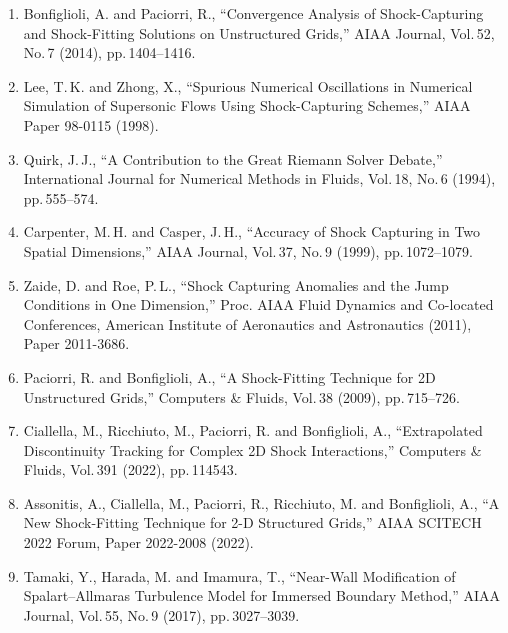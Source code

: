 \documentclass[a4j]{jarticle}
\begin{document}
\begin{enumerate}
  \item Bonfiglioli, A. and Paciorri, R., ``Convergence Analysis of Shock-Capturing and Shock-Fitting Solutions on Unstructured Grids,'' 
  AIAA Journal, Vol.\,52, No.\,7 (2014), pp.\,1404–1416.  
  \label{ref:scsf_conv}

  \item Lee, T.\,K. and Zhong, X., ``Spurious Numerical Oscillations in Numerical Simulation of Supersonic Flows Using Shock-Capturing Schemes,'' 
  AIAA Paper 98-0115 (1998).  
  \label{ref:osci}

  \item Quirk, J.\,J., ``A Contribution to the Great Riemann Solver Debate,'' 
  International Journal for Numerical Methods in Fluids, Vol.\,18, No.\,6 (1994), pp.\,555–574.
  \label{ref:plague}

  \item Carpenter, M.\,H. and Casper, J.\,H., ``Accuracy of Shock Capturing in Two Spatial Dimensions,'' 
  AIAA Journal, Vol.\,37, No.\,9 (1999), pp.\,1072–1079.
  \label{ref:posi1}

  \item Zaide, D. and Roe, P.\,L., ``Shock Capturing Anomalies and the Jump Conditions in One Dimension,'' 
  Proc. AIAA Fluid Dynamics and Co-located Conferences, American Institute of Aeronautics and Astronautics (2011), Paper 2011-3686.  
  \label{ref:posi2}

  \item Paciorri, R. and Bonfiglioli, A., ``A Shock-Fitting Technique for 2D Unstructured Grids,'' 
  Computers \& Fluids, Vol.\,38 (2009), pp.\,715--726.
  \label{ref:effdomain}

  \item Ciallella, M., Ricchiuto, M., Paciorri, R. and Bonfiglioli, A., ``Extrapolated Discontinuity Tracking for Complex 2D Shock Interactions,'' 
  Computers \& Fluids, Vol.\,391 (2022), pp.\,114543.
  \label{ref:eDIT}

  \item Assonitis, A., Ciallella, M., Paciorri, R., Ricchiuto, M. and Bonfiglioli, A., ``A New Shock-Fitting Technique for 2-D Structured Grids,'' 
  AIAA SCITECH 2022 Forum, Paper 2022-2008 (2022).
  \label{ref:SESF}

  \item Tamaki, Y., Harada, M. and Imamura, T., ``Near-Wall Modification of Spalart–Allmaras Turbulence Model for Immersed Boundary Method,'' 
  AIAA Journal, Vol.\,55, No.\,9 (2017), pp.\,3027--3039.
  \label{ref:IBM}


\end{enumerate}
\end{document}
